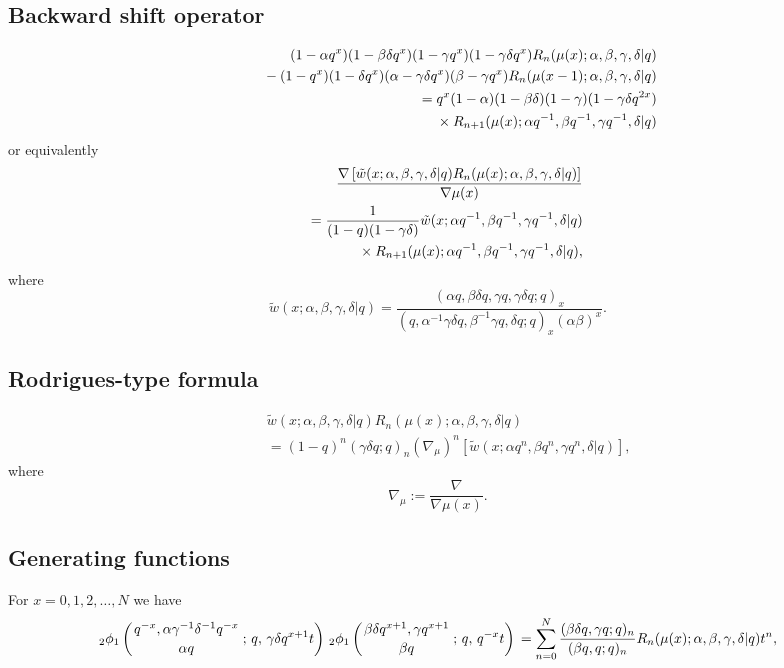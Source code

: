 \documentclass[envcountchap,graybox]{svmono}
\newcommand{\qhyp}[5]{\mbox{}_{#1}{\phi}_{#2}
\left(\genfrac{}{}{0pt}{}{#3}{#4}\,;\,q,\,#5\right)}
\newcommand{\mathindent}{\hspace{7.5mm}}
\newcommand{\qhyp}[5]{\,\mbox{}_{#1}\phi_{#2}\!\left(
  \genfrac{}{}{0pt}{}{#3}{#4};#5\right)}
\begin{document}
\subsection*{Backward shift operator}
\begin{eqnarray}
\label{shift2qRacahI}
& &(1-\alpha q^x)(1-\beta\delta q^x)(1-\gamma q^x)(1-\gamma\delta q^x)R_n(\mu(x);\alpha,\beta,\gamma,\delta|q)\nonumber\\
& &{}\mathindent{}-(1-q^x)(1-\delta q^x)(\alpha-\gamma\delta q^x)(\beta-\gamma q^x)R_n(\mu(x-1);\alpha,\beta,\gamma,\delta|q)\nonumber\\
& &{}=q^x(1-\alpha)(1-\beta\delta)(1-\gamma)(1-\gamma\delta q^{2x})\nonumber\\
& &{}\mathindent\times R_{n+1}(\mu(x);\alpha q^{-1},\beta q^{-1},\gamma q^{-1},\delta|q)
\end{eqnarray}
or equivalently
\begin{eqnarray}
\label{shift2qRacahII}
& &\frac{\nabla\left[{\tilde w}(x;\alpha,\beta,\gamma,\delta|q)R_n(\mu(x);\alpha,\beta,\gamma,\delta|q)\right]}{\nabla\mu(x)}\nonumber\\
& &{}=\frac{1}{(1-q)(1-\gamma\delta)}{\tilde w}(x;\alpha q^{-1},\beta q^{-1},\gamma q^{-1},\delta|q)\nonumber\\
& &{}\mathindent{}\times R_{n+1}(\mu(x);\alpha q^{-1},\beta q^{-1},\gamma q^{-1},\delta|q),
\end{eqnarray}
where
$${\tilde w}(x;\alpha,\beta,\gamma,\delta|q)=\frac{(\alpha q,\beta\delta q,\gamma q,\gamma\delta q;q)_x}
{(q,\alpha^{-1}\gamma\delta q,\beta^{-1}\gamma q,\delta q;q)_x(\alpha\beta)^x}.$$

\subsection*{Rodrigues-type formula}
\begin{eqnarray}
\label{RodqRacah}
& &{\tilde w}(x;\alpha,\beta,\gamma,\delta|q)R_n(\mu(x);\alpha,\beta,\gamma,\delta|q)\nonumber\\
& &{}=(1-q)^n(\gamma\delta q;q)_n\left(\nabla_{\mu}\right)^n
\left[{\tilde w}(x;\alpha q^n,\beta q^n,\gamma q^n,\delta|q)\right],
\end{eqnarray}
where
$$\nabla_{\mu}:=\frac{\nabla}{\nabla\mu(x)}.$$

\subsection*{Generating functions} For $x=0,1,2,\ldots,N$ we have
\begin{equation}
\label{GenqRacah1}
\qhyp{2}{1}{q^{-x},\alpha\gamma^{-1}\delta^{-1}q^{-x}}{\alpha q}{\gamma\delta q^{x+1}t}\,
\qhyp{2}{1}{\beta\delta q^{x+1},\gamma q^{x+1}}{\beta q}{q^{-x}t}
{}=\sum_{n=0}^N\frac{(\beta\delta q,\gamma q;q)_n}{(\beta q,q;q)_n}
R_n(\mu(x);\alpha,\beta,\gamma,\delta|q)t^n,
\end{equation}
\end{document}
